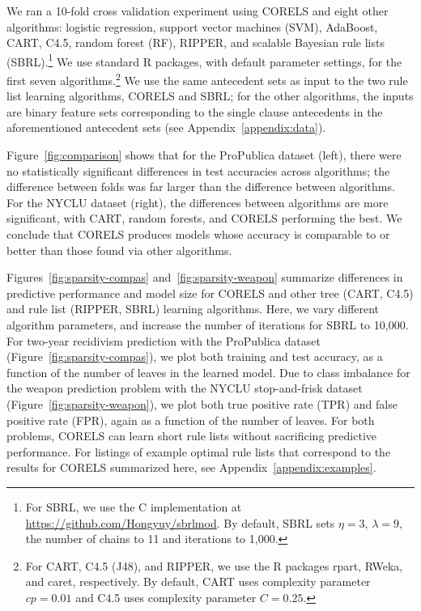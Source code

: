 We ran a 10-fold cross validation experiment using CORELS
and eight other algorithms:
logistic regression, support vector machines (SVM), AdaBoost, CART, C4.5,
random forest (RF), RIPPER, and scalable Bayesian rule lists (SBRL).\footnote{For
SBRL, we use the C implementation at \url{https://github.com/Hongyuy/sbrlmod}.
By default, SBRL sets ${\eta = 3}$, ${\lambda = 9}$,
the number of chains to 11 and iterations to 1,000.}
%
We use standard R packages, with default parameter settings,
for the first seven algorithms.\footnote{For CART, C4.5 (J48), and RIPPER,
we use the R packages rpart, RWeka, and caret, respectively.
%
By default, CART uses complexity parameter ${cp = 0.01}$ and C4.5 uses complexity parameter ${C = 0.25}$.
}
%
We use the same antecedent sets as input to the two rule list learning algorithms, CORELS and SBRL;
for the other algorithms, the inputs are binary feature sets corresponding to the
single clause antecedents in the aforementioned antecedent sets (see Appendix~\ref{appendix:data}).

Figure~\ref{fig:comparison} shows that for the ProPublica dataset (left),
there were no statistically significant differences in test accuracies across algorithms;
the difference between folds was far larger than the difference between algorithms.
%
For the NYCLU dataset (right), the differences between algorithms are more significant,
with CART, random forests, and CORELS performing the best.
%
We conclude that CORELS produces models whose accuracy is comparable to or better than
those found via other algorithms.

Figures~\ref{fig:sparsity-compas} and~\ref{fig:sparsity-weapon} summarize differences
in predictive performance and model size
for CORELS and other tree (CART, C4.5) and rule list (RIPPER, SBRL) learning algorithms.
%
Here, we vary different algorithm parameters, and increase the number of iterations for SBRL to 10,000.
%
For two-year recidivism prediction with the ProPublica dataset (Figure~\ref{fig:sparsity-compas}),
we plot both training and test accuracy,
as a function of the number of leaves in the learned model.
%
Due to class imbalance for the weapon prediction problem with the NYCLU stop-and-frisk dataset
(Figure~\ref{fig:sparsity-weapon}), we plot both true positive rate (TPR) and false positive rate (FPR),
again as a function of the number of leaves.
%
For both problems, CORELS can learn short rule lists without sacrificing predictive performance.
%
For listings of example optimal rule lists that correspond to the results
for CORELS summarized here, see Appendix~\ref{appendix:examples}.

